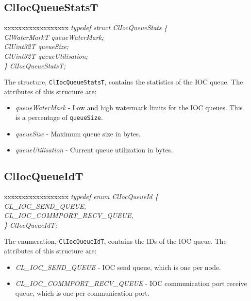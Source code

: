 \begin{flushleft}
 \subsection{ClIocQueueStatsT}
 \begin{tabbing}
 xx\=xx\=xx\=xx\=xx\=xx\=xx\=xx\=xx\=\kill
 \textit{typedef struct ClIocQueueStats \{}\\
 \>\>\>\>\textit{ClWaterMarkT queueWaterMark;}\\
 \>\>\>\>\textit{ClUint32T queueSize;}\\
 \>\>\>\>\textit{ClUint32T queueUtilisation;}\\
\textit{\} ClIocQueueStatsT;}\end{tabbing}
The structure, {\tt{ClIocQueueStatsT}}, contains the statistics of the IOC queue. The attributes of this structure are:
\begin{itemize}
\item
\textit{queueWaterMark} - Low and high watermark limits for the IOC queues. This is a percentage of {\tt{queueSize}}.
\item
\textit{queueSize} - Maximum queue size in bytes.
\item
\textit{queueUtilisation} - Current queue utilization in bytes.
\end{itemize}



\subsection{ClIocQueueIdT}
\begin{tabbing}
xx\=xx\=xx\=xx\=xx\=xx\=xx\=xx\=xx\=\kill
\textit{typedef enum ClIocQueueId \{}\\
\>\>\>\>\textit{CL\_IOC\_SEND\_QUEUE,}\\
\>\>\>\>\textit{CL\_IOC\_COMMPORT\_RECV\_QUEUE,}\\
\>\>\>\>\textit{\} ClIocQueueIdT;}\end{tabbing}
The enumeration, {\tt{ClIocQueueIdT}}, contains the IDs of the IOC queue. The attributes of this structure are:
\begin{itemize}
\item
\textit{CL\_\-IOC\_\-SEND\_\-QUEUE} - IOC send queue, which is one per node.
\item
\textit{CL\_\-IOC\_\-COMMPORT\_\-RECV\_\-QUEUE} - IOC communication port receive queue, which is one per communication port.
\end{itemize}


\end{flushleft}

